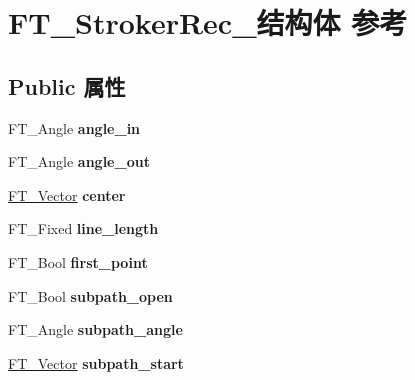 \hypertarget{struct_f_t___stroker_rec__}{}\section{F\+T\+\_\+\+Stroker\+Rec\+\_\+结构体 参考}
\label{struct_f_t___stroker_rec__}
\subsection*{Public 属性}
\begin{DoxyCompactItemize}
\item 
\mbox{\label{struct_f_t___stroker_rec___aadfca07b64504ba811ff9e6368730f54}} 
F\+T\+\_\+\+Angle {\bfseries angle\+\_\+in}
\item 
\mbox{\label{struct_f_t___stroker_rec___aeda942b373d6b59f7897bf1a7b995c80}} 
F\+T\+\_\+\+Angle {\bfseries angle\+\_\+out}
\item 
\mbox{\label{struct_f_t___stroker_rec___a234a7706b9f5cae4b10bfdf190295e64}} 
\hyperlink{struct_f_t___vector__}{F\+T\+\_\+\+Vector} {\bfseries center}
\item 
\mbox{\label{struct_f_t___stroker_rec___a69f0a2dcd66cb3d3c055b1acce57366c}} 
F\+T\+\_\+\+Fixed {\bfseries line\+\_\+length}
\item 
\mbox{\label{struct_f_t___stroker_rec___ac070264861fbe81c96fc600712647da6}} 
F\+T\+\_\+\+Bool {\bfseries first\+\_\+point}
\item 
\mbox{\label{struct_f_t___stroker_rec___a2f21e742ab0a67d72f96642874c7c0a5}} 
F\+T\+\_\+\+Bool {\bfseries subpath\+\_\+open}
\item 
\mbox{\label{struct_f_t___stroker_rec___a6f8b76c49aa6c7ce0f079ccda7e400ec}} 
F\+T\+\_\+\+Angle {\bfseries subpath\+\_\+angle}
\item 
\mbox{\label{struct_f_t___stroker_rec___a05aee6db9599e5d0494d898e1ea32675}} 
\hyperlink{struct_f_t___vector__}{F\+T\+\_\+\+Vector} {\bfseries subpath\+\_\+start}

\end{DoxyCompactItemize}
